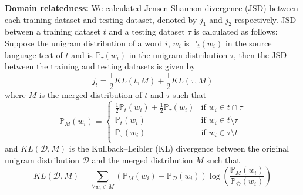 \documentclass[11pt]{article}
\begin{document}
\textbf{Domain relatedness:} We calculated Jensen-Shannon divergence (JSD) between each training dataset and testing dataset, denoted by $j_1$ and $j_2$ respectively.
JSD between a training dataset $t$ and a testing dataset $\tau$ is calculated as follows: Suppose the unigram distribution of a word $i$, $w_i$ is $\mathbb{P}_{t}(w_i)$ in the source language text of $t$ and is $\mathbb{P}_{\tau}(w_i)$ in the unigram distribution $\tau$, then the JSD between the training and testing datasets is given by
\begin{equation*}
    j_t = \frac{1}{2} KL (t, M) + \frac{1}{2} KL (\tau, M) 
\end{equation*}
where $M$ is the merged distribution of $t$ and $\tau$ such that
$$\mathbb{P}_{M}(w_i) = \begin{cases}
    \frac{1}{2} \mathbb{P}_{t}(w_i) + \frac{1}{2} \mathbb{P}_{\tau}(w_i) & \text {if $w_i \in t \cap \tau$} \\
    \mathbb{P}_{t}(w_i) & \text{if $w_i \in t \setminus \tau$} \\
    \mathbb{P}_{\tau}(w_i) & \text{if $w_i \in \tau \setminus t$} \\
\end{cases}$$
and $KL(\mathcal{D}, M)$ is the Kullback–Leibler (KL) divergence between the original unigram distribution $\mathcal{D}$ and the merged distribution $M$ such that
$$KL(\mathcal{D}, M) = \sum_{\forall w_i \in M} (\mathbb{P}_{M}(w_i) - \mathbb{P}_{\mathcal{D}}(w_i))\log \left( \frac{\mathbb{P}_{M}(w_i)}{\mathbb{P}_{\mathcal{D}}(w_i)} \right)$$
\end{document}
